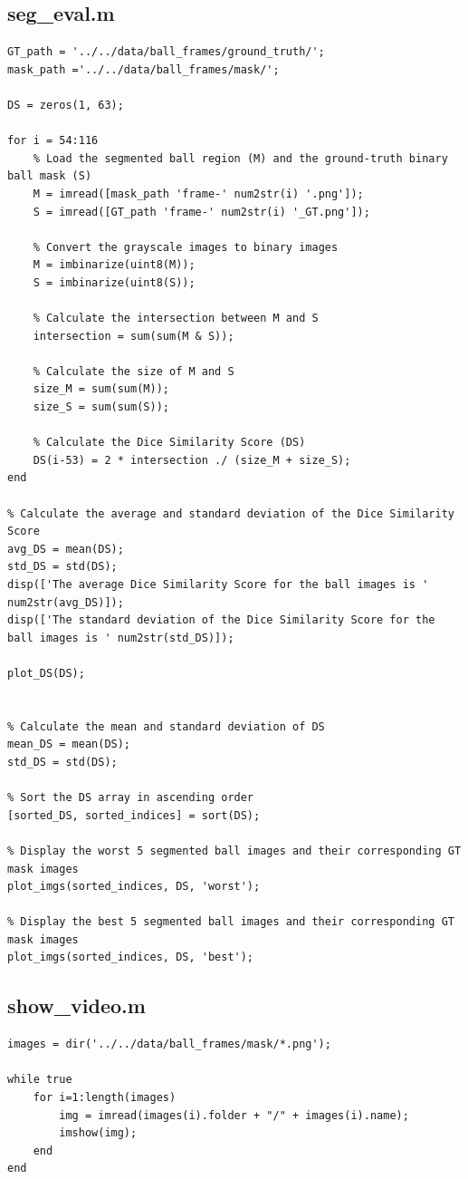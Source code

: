 \documentclass[conference]{IEEEtran}
\begin{document}
        \subsection{seg\_eval.m}
            \begin{lstlisting}[style=Matlab-editor, basicstyle=\scriptsize]
GT_path = '../../data/ball_frames/ground_truth/';
mask_path ='../../data/ball_frames/mask/';

DS = zeros(1, 63);

for i = 54:116
    % Load the segmented ball region (M) and the ground-truth binary ball mask (S)
    M = imread([mask_path 'frame-' num2str(i) '.png']);
    S = imread([GT_path 'frame-' num2str(i) '_GT.png']);

    % Convert the grayscale images to binary images
    M = imbinarize(uint8(M));
    S = imbinarize(uint8(S));

    % Calculate the intersection between M and S
    intersection = sum(sum(M & S));

    % Calculate the size of M and S
    size_M = sum(sum(M));
    size_S = sum(sum(S));

    % Calculate the Dice Similarity Score (DS)
    DS(i-53) = 2 * intersection ./ (size_M + size_S);
end

% Calculate the average and standard deviation of the Dice Similarity Score
avg_DS = mean(DS);
std_DS = std(DS);
disp(['The average Dice Similarity Score for the ball images is ' num2str(avg_DS)]);
disp(['The standard deviation of the Dice Similarity Score for the ball images is ' num2str(std_DS)]);

plot_DS(DS);


% Calculate the mean and standard deviation of DS
mean_DS = mean(DS);
std_DS = std(DS);

% Sort the DS array in ascending order
[sorted_DS, sorted_indices] = sort(DS);

% Display the worst 5 segmented ball images and their corresponding GT mask images
plot_imgs(sorted_indices, DS, 'worst');

% Display the best 5 segmented ball images and their corresponding GT mask images
plot_imgs(sorted_indices, DS, 'best');
            \end{lstlisting}
        \subsection{show\_video.m}
            \begin{lstlisting}[style=Matlab-editor, basicstyle=\scriptsize]
images = dir('../../data/ball_frames/mask/*.png');

while true
    for i=1:length(images)
        img = imread(images(i).folder + "/" + images(i).name);
        imshow(img);
    end
end
            \end{lstlisting}
\end{document}

